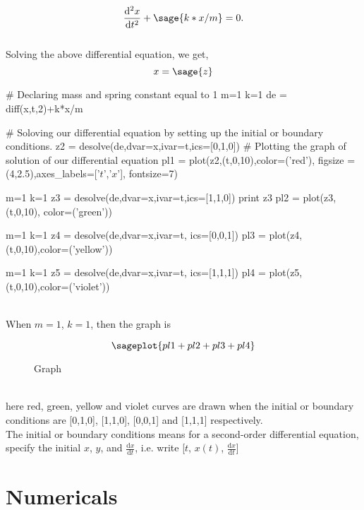 \documentclass{report}
\begin{document}
\[
  \frac{\mathrm{d}^{2}x}{\mathrm{d}t^{2}} +  \sage{k*x/m} = 0.
\]\\
Solving the above differential equation, we get,
$$x = \sage{z}$$
\begin{sagesilent}
# Declaring mass and spring constant equal to 1
m=1
k=1
de = diff(x,t,2)+k*x/m

# Soloving our differential equation by setting up the initial or boundary conditions.
z2 = desolve(de,dvar=x,ivar=t,ics=[0,1,0])
# Plotting the graph of solution of our differential equation
pl1 = plot(z2,(t,0,10),color=('red'), figsize = (4,2.5),axes_labels=['$t$','$x$'], fontsize=7)

m=1
k=1
z3 = desolve(de,dvar=x,ivar=t,ics=[1,1,0])
print z3
pl2 = plot(z3,(t,0,10), color=('green'))

m=1
k=1
z4 = desolve(de,dvar=x,ivar=t, ics=[0,0,1])
pl3 = plot(z4,(t,0,10),color=('yellow'))

m=1
k=1
z5 = desolve(de,dvar=x,ivar=t, ics=[1,1,1])
pl4 = plot(z5,(t,0,10),color=('violet'))
\end{sagesilent}\\
When $m=1$, $k=1$, then the graph is
\begin{figure}[h!]
$$\sageplot{pl1+pl2+pl3+pl4}$$
\caption{Graph}
\end{figure}\\
here red, green, yellow and violet curves are drawn when the initial or boundary conditions are [0,1,0], [1,1,0], [0,0,1] and [1,1,1] respectively.\\
The initial or boundary conditions means for a second-order differential equation, specify the initial $x$, $y$, and $\frac{\mathrm{d}x}{\mathrm{d}t}$, i.e. write [$t$, $x(t)$, $\frac{\mathrm{d}x}{\mathrm{d}t}$]

\section{Numericals}
\end{document}
